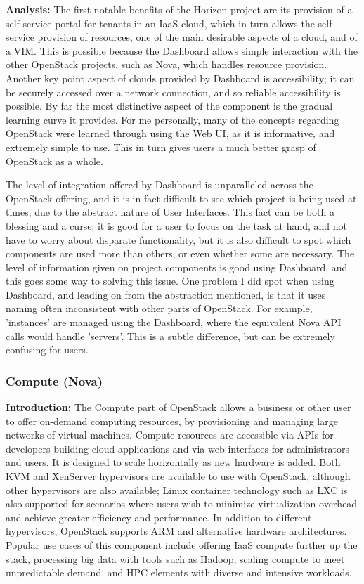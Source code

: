 \textbf{Analysis:}
The first notable benefits of the Horizon project are its provision of a self-service portal for tenants in an IaaS cloud, which in turn allows the self-service provision of resources, one of the main desirable aspects of a cloud, and of a VIM. This is possible because the Dashboard allows simple interaction with the other OpenStack projects, such as Nova, which handles resource provision. 
Another key point aspect of clouds provided by Dashboard is accessibility; it can be securely accessed over a network connection, and so reliable accessibility is possible. 
By far the most distinctive aspect of the component is the gradual learning curve it provides. For me personally, many of the concepts regarding OpenStack were learned through using the Web UI, as it is informative, and extremely simple to use. This in turn gives users a much better grasp of OpenStack as a whole. 
 
The level of integration offered by Dashboard is unparalleled across the OpenStack offering, and it is in fact difficult to see which project is being used at times, due to the abstract nature of User Interfaces. This fact can be both a blessing and a curse; it is good for a user to focus on the task at hand, and not have to worry about disparate functionality, but it is also difficult to spot which components are used more than others, or even whether some are necessary. The level of information given on project components is good using Dashboard, and this goes some way to solving this issue. 
One problem I did spot when using Dashboard, and leading on from the abstraction mentioned, is that it uses naming often inconsistent with other parts of OpenStack. For example, 'instances' are managed using the Dashboard, where the equivalent Nova API calls would handle 'servers'. This is a subtle difference, but can be extremely confusing for users. 

\subsubsection{Compute (Nova)}

\textbf{Introduction:}
The Compute part of OpenStack allows a business or other user to offer on-demand computing resources, by provisioning and managing large networks of virtual machines. Compute resources are accessible via APIs for developers building cloud applications and via web interfaces for administrators and users\cite{openstackcompute}. It is designed to scale horizontally as new hardware is added. 
Both KVM and XenServer hypervisors are available to use with OpenStack, although other hypervisors are also available;  Linux container technology such as LXC is also supported for scenarios where users wish to minimize virtualization overhead and achieve greater efficiency and performance. In addition to different hypervisors, OpenStack supports ARM and alternative hardware architectures\cite{openstackcompute}. \\
Popular use cases of this component include offering IaaS compute further up the stack, processing big data with tools such as Hadoop, scaling compute to meet unpredictable demand, and HPC elements with diverse and intensive workloads. 


